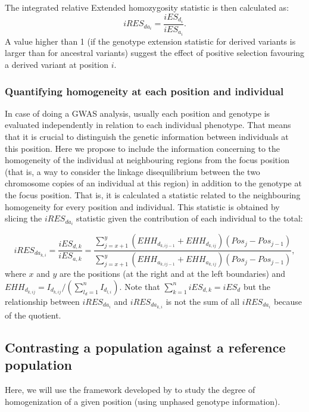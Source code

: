 \documentclass[a4paper,11pt]{article}
\begin{document}
The integrated relative Extended homozygosity statistic is then calculated as:
 \begin{equation}
 iRES_{da_{i}} = \frac{iES_{d_{i}}} {iES_{a_{i}}}.
 \end{equation}
A value higher than 1 (if the genotype extension statistic for derived variants is larger than for ancestral variants) suggest the effect of positive selection favouring a derived variant at position $i$.  

\subsubsection{Quantifying homogeneity at each position and individual}
In case of doing a GWAS analysis, usually each position and genotype is evaluated independently in relation to each individual phenotype. That means that it is crucial to distinguish the genetic information between individuals at this position. Here we propose to include the information concerning to the homogeneity of the individual at neighbouring regions from the focus position (that is, a way to consider the linkage disequilibrium between the two chromosome copies of an individual at this region) in addition to the genotype at the focus position. That is, it is calculated a statistic related to the neighbouring homogeneity for every position and individual. This statistic is obtained by slicing the $iRES_{da_i}$ statistic given the contribution of each individual to the total:

 \begin{equation}
 iRES_{da_{k,i}} =  \frac{iES_{d,k}}{iES_{a,k}} = \frac{\sum_{j=x+1}^{y}(EHH_{d_{k,ij-1}}+ EHH_{d_{k,ij}})(Pos_{j} - Pos_{j-1})}  {\sum_{j=x+1}^{y}(EHH_{a_{k,ij-1}}+ EHH_{a_{k,ij}})(Pos_{j} - Pos_{j-1})},
 \end{equation}
where $x$ and $y$ are the positions (at the right and at the left boundaries) and $EHH_{d_{k,ij}} = I_{d_{k,ij}} / (\sum_{l_d=1}^{n}I_{d_{l,i}})$. Note that $\sum_{k=1}^{n}iES_{d,k}=iES_d$ but the relationship between $iRES_{da_{i}}$ and $iRES_{da_{k,i}}$ is not the sum of all $iRES_{da_i}$ because of the quotient.

\subsection{Contrasting a population against a reference population}
Here, we will use the framework developed by \cite{Tang:2007by} to study the degree of homogenization of a given position (using unphased genotype information).
\end{document}
